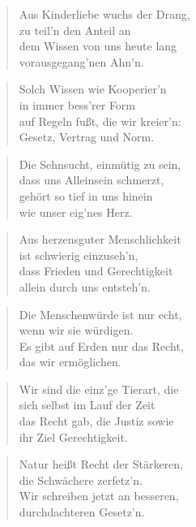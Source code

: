 \documentclass[10pt,a4paper]{article}
\begin{document}
\begin{multicols}{2}
\begin{verse}
Aus Kinderliebe wuchs der Drang, \\
zu teil’n den Anteil an \\
dem Wissen von uns heute lang \\
vorausgegang’nen Ahn’n. \\
\end{verse}

\begin{verse}
Solch Wissen wie Kooperier’n \\
in immer bess’rer Form \\
auf Regeln fußt, die wir kreier’n: \\
Gesetz, Vertrag und Norm. \\
\end{verse}

\begin{verse}
Die Sehnsucht, einmütig zu sein, \\
dass uns Alleinsein schmerzt, \\
gehört so tief in uns hinein \\
wie unser eig’nes Herz. \\
\end{verse}

\begin{verse}
Aus herzensguter Menschlichkeit \\
ist schwierig einzuseh’n, \\
dass Frieden und Gerechtigkeit \\
allein durch uns entsteh’n. \\
\end{verse}

\begin{verse}
Die Menschenwürde ist nur echt, \\
wenn wir sie würdigen. \\
Es gibt auf Erden nur das Recht, \\
das wir ermöglichen. \\
\end{verse}

\begin{verse}
Wir sind die einz’ge Tierart, die \\
sich selbst im Lauf der Zeit \\
das Recht gab, die Justiz sowie \\
ihr Ziel Gerechtigkeit. \\
\end{verse}

\begin{verse}
Natur heißt Recht der Stärkeren, \\
die Schwächere zerfetz’n. \\
Wir schreiben jetzt an besseren, \\
durchdachteren Gesetz’n. \\
\end{verse}


\end{multicols}
\end{document}
